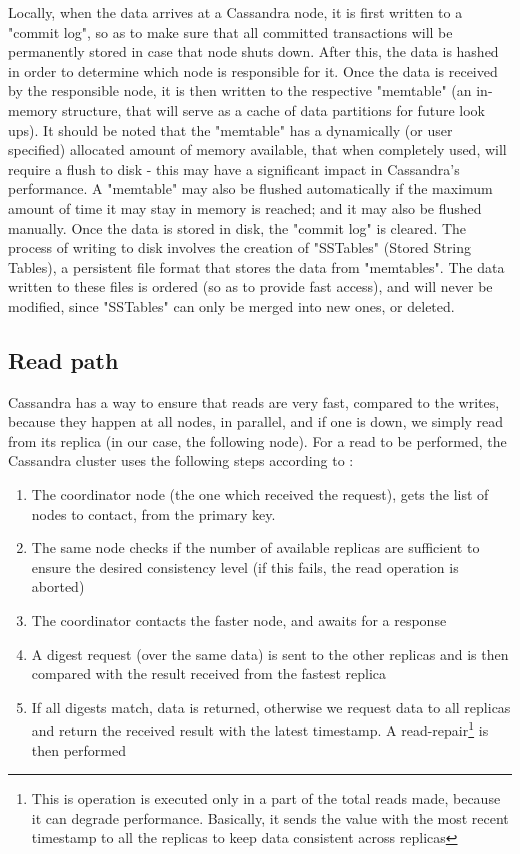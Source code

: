 \documentclass[runningheads]{llncs}
\begin{document}
Locally, when the data arrives at a Cassandra node, it is first written to a "commit log", so as to make sure that all committed transactions will be permanently stored in case that node shuts down. After this, the data is hashed in order to determine which node is responsible for it.
Once the data is received by the responsible node, it is then written to the respective "memtable" (an in-memory structure, that will serve as a cache of data partitions for future look ups). It should be noted that the "memtable" has a dynamically (or user specified) allocated amount of memory available, that when completely used, will require a flush to disk - this may have a significant impact in Cassandra's performance. A "memtable" may also be flushed automatically if the maximum amount of time it may stay in memory is reached; and it may also be flushed manually.
Once the data is stored in disk, the "commit log" is cleared.
The process of writing to disk involves the creation of "SSTables" (Stored String Tables), a persistent file format that stores the data from "memtables". The data written to these files is ordered (so as to provide fast access), and will never be modified, since "SSTables" can only be merged into new ones, or deleted.

\subsection{Read path}
Cassandra has a way to ensure that reads are very fast, compared to the writes, because they happen at all nodes, in parallel, and if one is down, we simply read from its replica (in our case, the following node).
For a read to be performed, the Cassandra cluster uses the following steps according to \cite{simplilearn}:
\begin{enumerate}
    \item The coordinator node (the one which received the request), gets the list of nodes to contact, from the primary key.
    \item The same node checks if the number of available replicas are sufficient to ensure the desired consistency level (if this fails, the read operation is aborted)
    \item The coordinator contacts the faster node, and awaits for a response
    \item A digest request (over the same data) is sent to the other replicas and is then compared with the result received from the fastest replica
    \item If all digests match, data is returned, otherwise we request data to all replicas and return the received result with the latest timestamp. A read-repair\footnote{This is operation is executed only in a part of the total reads made, because it can degrade performance. Basically, it sends the value with the most recent timestamp to all the replicas to keep data consistent across replicas} is then performed
\end{enumerate}
\end{document}
